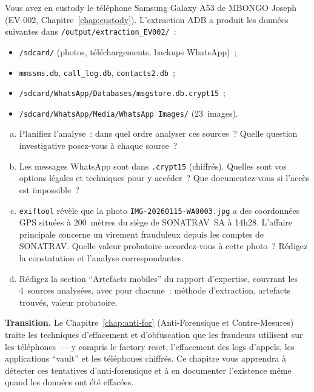 \begin{boxexo}[title={\ding{45}\quad Exercice~16.3 --- Investigation mobile complète \niveauexpert}]
Vous avez en custody le téléphone Samsung Galaxy A53 de MBONGO Joseph
(EV-002, Chapitre~\ref{chap:custody}). L'extraction ADB a produit
les données suivantes dans \texttt{/output/extraction\_EV002/}~:
\begin{itemize}
    \item \texttt{/sdcard/} (photos, téléchargements, backups WhatsApp)~;
    \item \texttt{mmssms.db}, \texttt{call\_log.db}, \texttt{contacts2.db}~;
    \item \texttt{/sdcard/WhatsApp/Databases/msgstore.db.crypt15}~;
    \item \texttt{/sdcard/WhatsApp/Media/WhatsApp Images/} (23~images).
\end{itemize}
\begin{enumerate}[(a)]
    \item Planifiez l'analyse~: dans quel ordre analyser ces sources~?
          Quelle question investigative posez-vous à chaque source~?
    \item Les messages WhatsApp sont dans \texttt{.crypt15} (chiffrés).
          Quelles sont vos options légales et techniques pour y accéder~?
          Que documentez-vous si l'accès est impossible~?
    \item \texttt{exiftool} révèle que la photo
          \texttt{IMG-20260115-WA0003.jpg} a des coordonnées GPS
          situées à 200~mètres du siège de SONATRAV~SA à 14h28.
          L'affaire principale concerne un virement frauduleux
          depuis les comptes de SONATRAV. Quelle valeur probatoire
          accordez-vous à cette photo~? Rédigez la constatation et
          l'analyse correspondantes.
    \item Rédigez la section ``Artefacts mobiles'' du rapport d'expertise,
          couvrant les 4~sources analysées, avec pour chacune~:
          méthode d'extraction, artefacts trouvés, valeur probatoire.
\end{enumerate}
\end{boxexo}

\bigskip

\begin{boxinfo}
\textbf{Transition.} Le Chapitre~\ref{chap:anti-for} (Anti-Forensique
et Contre-Mesures) traite les techniques d'effacement et d'obfuscation
que les fraudeurs utilisent sur les téléphones~--- y compris le
factory reset, l'effacement des logs d'appels, les applications
``vault'' et les téléphones chiffrés. Ce chapitre vous apprendra
à détecter ces tentatives d'anti-forensique et à en documenter
l'existence même quand les données ont été effacées.
\end{boxinfo}
